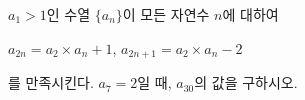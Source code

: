 $a_1>1$인 수열 $\{a_n\}$이 모든 자연수 $n$에 대하여 \par\smallskip\noindent\hspace*{1.5em}$a_{2n}=a_2\times a_n+1$, $a_{2n+1}=a_2\times a_n-2$\par\smallskip\noindent 를 만족시킨다. $a_7=2$일 때, $a_{30}$의 값을 구하시오.
